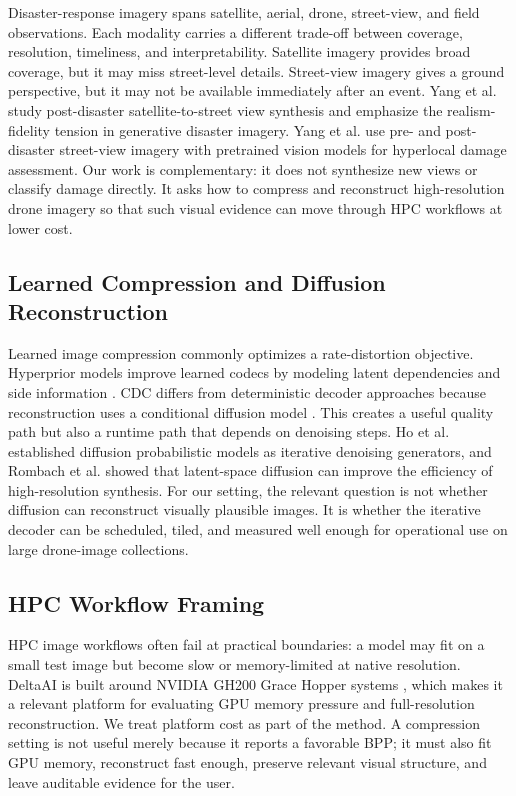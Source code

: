 \documentclass[conference]{IEEEtran}
\begin{document}
Disaster-response imagery spans satellite, aerial, drone, street-view, and field observations. Each modality carries a different trade-off between coverage, resolution, timeliness, and interpretability. Satellite imagery provides broad coverage, but it may miss street-level details. Street-view imagery gives a ground perspective, but it may not be available immediately after an event. Yang et al. \cite{yang2026satellite} study post-disaster satellite-to-street view synthesis and emphasize the realism-fidelity tension in generative disaster imagery. Yang et al. \cite{yang2025hyperlocal} use pre- and post-disaster street-view imagery with pretrained vision models for hyperlocal damage assessment. Our work is complementary: it does not synthesize new views or classify damage directly. It asks how to compress and reconstruct high-resolution drone imagery so that such visual evidence can move through HPC workflows at lower cost.

\subsection{Learned Compression and Diffusion Reconstruction}

Learned image compression commonly optimizes a rate-distortion objective. Hyperprior models improve learned codecs by modeling latent dependencies and side information \cite{balle2018hyperprior}. CDC differs from deterministic decoder approaches because reconstruction uses a conditional diffusion model \cite{yang2022lossy}. This creates a useful quality path but also a runtime path that depends on denoising steps. Ho et al. \cite{ho2020ddpm} established diffusion probabilistic models as iterative denoising generators, and Rombach et al. \cite{rombach2022ldm} showed that latent-space diffusion can improve the efficiency of high-resolution synthesis. For our setting, the relevant question is not whether diffusion can reconstruct visually plausible images. It is whether the iterative decoder can be scheduled, tiled, and measured well enough for operational use on large drone-image collections.

\subsection{HPC Workflow Framing}

HPC image workflows often fail at practical boundaries: a model may fit on a small test image but become slow or memory-limited at native resolution. DeltaAI is built around NVIDIA GH200 Grace Hopper systems \cite{ncsa2026deltaai}, which makes it a relevant platform for evaluating GPU memory pressure and full-resolution reconstruction. We treat platform cost as part of the method. A compression setting is not useful merely because it reports a favorable BPP; it must also fit GPU memory, reconstruct fast enough, preserve relevant visual structure, and leave auditable evidence for the user.
\end{document}
